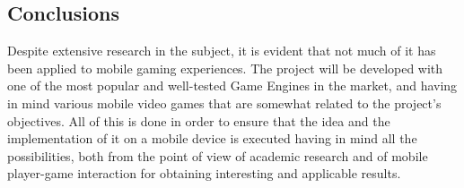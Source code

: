 \subsection{Conclusions}

Despite extensive research in the subject, it is evident that not much of it has been applied to mobile gaming experiences. The project will be developed with one of the most popular and well-tested Game Engines in the market, and having in mind various mobile video games that are somewhat related to the project's objectives. All of this is done in order to ensure that the idea and the implementation of it on a mobile device is executed having in mind all the possibilities, both from the point of view of academic research and of mobile player-game interaction for obtaining interesting and applicable results.
